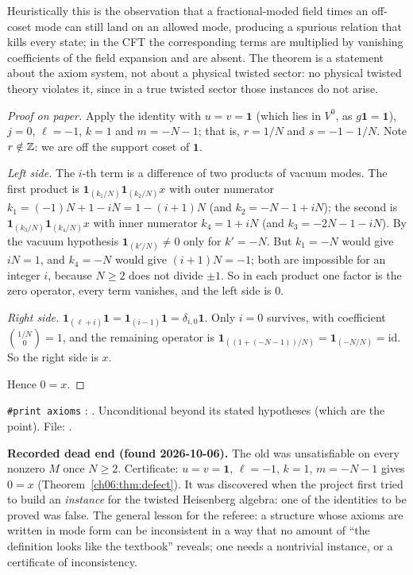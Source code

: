 \begin{physics}
Heuristically this is the observation that a fractional-moded field times an off-coset mode can still land on an allowed mode, producing a spurious relation that kills every state; in the CFT the corresponding terms are multiplied by vanishing coefficients of the field expansion and are absent. The theorem is a statement about the axiom system, not about a physical twisted sector: no physical twisted theory violates it, since in a true twisted sector those instances do not arise.
\end{physics}
\begin{proof}[Proof on paper]
Apply the identity with $u=v=\mathbf 1$ (which lies in $V^0$, as $g\mathbf 1=\mathbf 1$), $j=0$,
$\ell=-1$, $k=1$ and $m=-N-1$; that is, $r=1/N$ and $s=-1-1/N$.  Note $r\notin{\mathbb{Z}}$: we are off the
support coset of $\mathbf 1$.

\emph{Left side.}  The $i$-th term is a difference of two products of vacuum modes.  The first
product is $\mathbf 1_{(k_1/N)}\mathbf 1_{(k_2/N)}x$ with outer numerator
$k_1=(-1)N+1-iN=1-(i+1)N$ (and $k_2=-N-1+iN$); the second is
$\mathbf 1_{(k_3/N)}\mathbf 1_{(k_4/N)}x$ with inner numerator $k_4=1+iN$ (and $k_3=-2N-1-iN$).  By
the vacuum hypothesis $\mathbf 1_{(k'/N)}\ne 0$ only for $k'=-N$.  But $k_1=-N$ would give $iN=1$,
and $k_4=-N$ would give $(i+1)N=-1$; both are impossible for an integer $i$, because $N\ge2$ does
not divide $\pm1$.  So in each product one factor is the zero operator, every term vanishes, and
the left side is $0$.

\emph{Right side.}  $\mathbf 1_{(\ell+i)}\mathbf 1=\mathbf 1_{(i-1)}\mathbf 1=\delta_{i,0}\mathbf 1$.
Only $i=0$ survives, with coefficient $\binom{1/N}{0}=1$, and the remaining operator is
$\mathbf 1_{((1+(-N-1))/N)}=\mathbf 1_{(-N/N)}=\mathrm{id}$.  So the right side is $x$.

Hence $0=x$.
\end{proof}
\begin{status}
\texttt{\#print axioms} : .
Unconditional beyond its stated hypotheses (which are the point).  File:
.
\end{status}

\begin{warning}
\textbf{Recorded dead end (found 2026-10-06).}  The old  was
unsatisfiable on every nonzero $M$ once $N\ge2$.  Certificate: $u=v=\mathbf 1$, $\ell=-1$, $k=1$,
$m=-N-1$ gives $0=x$ (Theorem~\ref{ch06:thm:defect}).  It was discovered when the project first
tried to build an \emph{instance} for the twisted Heisenberg algebra: one of the identities to be
proved was false.  The general lesson for the referee: a structure whose axioms are written in mode
form can be inconsistent in a way that no amount of ``the definition looks like the textbook''
reveals; one needs a nontrivial instance, or a certificate of inconsistency.
\end{warning}


